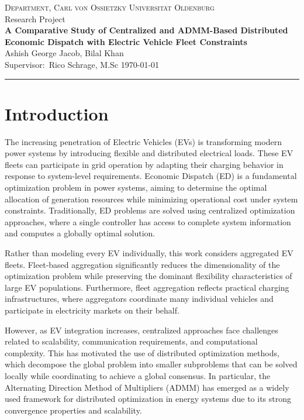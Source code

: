 \documentclass[12pt, a4paper]{article}
\newcommand{\proposaltitle}{A Comparative Study of Centralized and ADMM-Based Distributed Economic Dispatch with Electric Vehicle Fleet Constraints}
\newcommand{\proposalauthor}{Ashish George Jacob, Bilal Khan}
\newcommand{\proposalaffiliation}{Department, Carl von Ossietzky Universität Oldenburg}
\newcommand{\proposalsupervisor}{Rico Schrage, M.Sc}
\newcommand{\proposalcourse}{Research Project}
\newcommand{\proposaldate}{\today}
\begin{document}
\thispagestyle{empty}
%
\begin{center}
  {\small\scshape\color{hint} \proposalaffiliation}\\[0.3em]
  {\small\color{hint} \proposalcourse}\\[1.8em]
  {\Large\bfseries\color{heading} \proposaltitle}\\[1.0em]
  {\normalsize \proposalauthor}\\[0.4em]
  {\small\color{hint}
    Supervisor:~\proposalsupervisor
    \enspace\textperiodcentered\enspace
    \proposaldate}\\[1.2em]
  {\color{rule}\hrule}
\end{center}
%
\vspace{0.6em}
%
\section{Introduction}
%

%

The increasing penetration of Electric Vehicles (EVs) is transforming modern power systems by introducing flexible and distributed electrical loads. These EV fleets can participate in grid operation by adapting their charging behavior in response to system-level requirements. Economic Dispatch (ED) is a fundamental optimization problem in power systems, aiming to determine the optimal allocation of generation resources while minimizing operational cost under system constraints. Traditionally, ED problems are solved using centralized optimization approaches, where a single controller has access to complete system information and computes a globally optimal solution.

Rather than modeling every EV individually, this work considers aggregated EV fleets. Fleet-based aggregation significantly reduces the dimensionality of the optimization problem while preserving the dominant flexibility characteristics of large EV populations. Furthermore, fleet aggregation reflects practical charging infrastructures, where aggregators coordinate many individual vehicles and participate in electricity markets on their behalf.

However, as EV integration increases, centralized approaches face challenges related to scalability, communication requirements, and computational complexity. This has motivated the use of distributed optimization methods, which decompose the global problem into smaller subproblems that can be solved locally while coordinating to achieve a global consensus. In particular, the Alternating Direction Method of Multipliers (ADMM) has emerged as a widely used framework for distributed optimization in energy systems due to its strong convergence properties and scalability.
\end{document}
